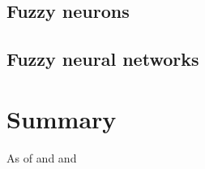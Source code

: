 \documentclass[a4paper,11pt]{article}
\begin{document}
\subsection{Fuzzy neurons}


\subsection{Fuzzy neural networks}



\clearpage
\section{Summary} 

As of \cite{fuzzy_db} and \cite{seattlerobotics} and \cite{fuzzy_sets_zadeh}


\clearpage
\label{Bibliography} 
%

\footnotesize{  }


%
%
%
\end{document}
